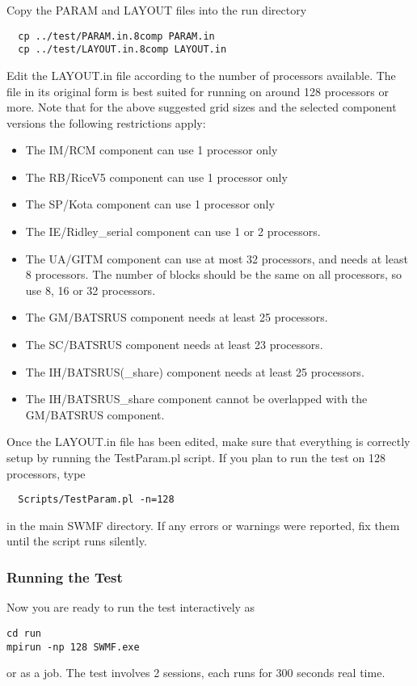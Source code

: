 \documentclass[twoside,10pt]{article}
\begin{document}
Copy the PARAM and LAYOUT files into the run directory
\begin{verbatim}
  cp ../test/PARAM.in.8comp PARAM.in
  cp ../test/LAYOUT.in.8comp LAYOUT.in
\end{verbatim}
Edit the LAYOUT.in file according to the number of processors
available. The file in its original form is best suited for 
running on around 128 processors or more.
Note that for the above suggested grid sizes and the
selected component versions the following restrictions apply:
\begin{itemize}
\item The IM/RCM component can use 1 processor only
\item The RB/RiceV5 component can use 1 processor only
\item The SP/Kota component can use 1 processor only
\item The IE/Ridley\_serial component can use 1 or 2 processors.
\item The UA/GITM component can use at most 32 processors, 
      and needs at least 8 processors. The number of blocks should
      be the same on all processors, so use 8, 16 or 32 processors.
\item The GM/BATSRUS component needs at least 25 processors.
\item The SC/BATSRUS component needs at least 23 processors.
\item The IH/BATSRUS(\_share) component needs at least 25 processors.
\item The IH/BATSRUS\_share component cannot be overlapped with the
      GM/BATSRUS component.
\end{itemize}
Once the LAYOUT.in file has been edited, make sure that everything
is correctly setup by running the TestParam.pl script. 
If you plan to run the test on 128 processors, type
\begin{verbatim}
  Scripts/TestParam.pl -n=128
\end{verbatim}
in the main SWMF directory.
If any errors or warnings were reported, fix them until the script
runs silently. 

\subsubsection{Running the Test}

Now you are ready to run the test interactively as
\begin{verbatim}
cd run
mpirun -np 128 SWMF.exe
\end{verbatim}
or as a job. The test involves 2 sessions, each runs for 300 seconds
real time. 
\end{document}

